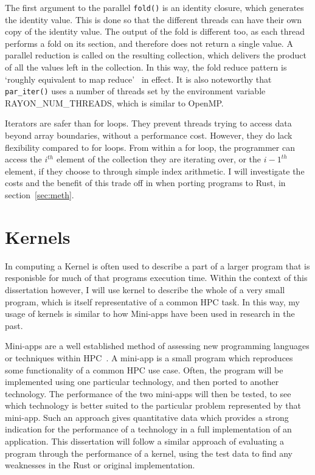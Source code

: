 The first argument to the parallel \texttt{fold()} is an identity closure, which generates the identity value. This is done so that the different threads can have their own copy of the identity value. The output of the fold is different too, as each thread performs a fold on its section, and therefore does not return a single value. A parallel reduction is called on the resulting collection, which delivers the product of all the values left in the collection.
In this way, the fold reduce pattern is `roughly equivalent to map reduce'~\cite{rayonFold} in effect. It is also noteworthy that \texttt{par\_iter()} uses a number of threads set by the environment variable RAYON\_NUM\_THREADS, which is similar to OpenMP\@.

Iterators are safer than for loops. They prevent threads trying to access data beyond array boundaries, without a performance cost. However, they do lack flexibility compared to for loops. From within a for loop, the programmer can access the $i^{th}$ element of the collection they are iterating over, or the $i-1^{th}$ element, if they choose to through simple index arithmetic. I will investigate the costs and the benefit of this trade off in when porting programs to Rust, in section~\ref{sec:meth}.

\section{Kernels}
In computing a Kernel is often used to describe a part of a larger program that is responisble for much of that programs execution time. Within the context of this dissertation however, I will use kernel to describe the whole of a very small program, which is itself representative of a common HPC task. In this way, my usage of kernels is similar to how Mini-apps have been used in research in the past.

Mini-apps are a well established method of assessing new programming languages or techniques within HPC~\cite{Mallinson:2014, Slaughter:2015, martineau2017arch}. A mini-app is a small program which reproduces some functionality of a common HPC use case. Often, the program will be implemented using one particular technology, and then ported to another technology. The performance of the two mini-apps will then be tested, to see which technology is better suited to the particular problem represented by that mini-app. Such an approach gives quantitative data which provides a strong indication for the performance of a technology in a full implementation of an application. 
This dissertation will follow a similar approach of evaluating a program through the performance of a kernel, using the test data to find any weaknesses in the Rust or original implementation.

